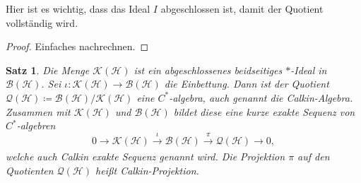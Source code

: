 \documentclass[11pt, hidelinks]{article}
\newcommand{\h}{\mathcal{H}}
\numberwithin{conj}{section}
\newtheorem{theorem}[conj]{Satz}
\begin{document}
Hier ist es wichtig, dass das Ideal $I$ abgeschlossen ist, damit der Quotient vollständig wird.

\begin{proof}
    Einfaches nachrechnen.
\end{proof}

\begin{theorem}
Die Menge $\mathcal{K}(\h)$ ist ein abgeschlossenes beidseitiges $\ast$-Ideal in $\mathcal{B}(\h)$. Sei $\iota: \mathcal{K}(\h) \to \mathcal{B}(\h)$ die Einbettung. Dann ist der Quotient $\mathcal{Q}(\h) \coloneq \mathcal{B}(\h)/\mathcal{K}(\h)$ eine $C^\ast$-algebra, auch genannt die Calkin-Algebra. Zusammen mit $\mathcal{K}(\h)$ und $\mathcal{B}(\h)$ bildet diese eine kurze exakte Sequenz von $C^\ast$-algebren
\begin{equation}
    0 \to \mathcal{K}(\h) \xrightarrow[]{\iota} \mathcal{B}(\h) \xrightarrow[]{\pi} \mathcal{Q}(\h) \to 0,
\end{equation}
welche auch Calkin exakte Sequenz genannt wird. Die Projektion $\pi$ auf den Quotienten $\mathcal{Q}(\h)$ heißt Calkin-Projektion.
\end{theorem}
\end{document}
